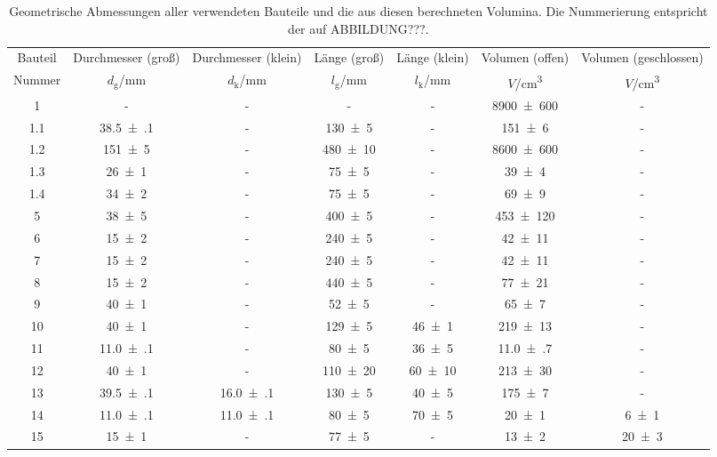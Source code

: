 \begin{table}[!h]
	\centering
	\begin{adjustbox}{width=\textwidth}
	\begin{tabular}{ccccccc}
		\toprule
		Bauteil & Durchmesser (groß) & Durchmesser (klein) & Länge (groß) & Länge (klein) & Volumen (offen) & Volumen (geschlossen)\\
		Nummer & $d_\mathrm{g}$/\si{mm} & $d_\mathrm{k}$/\si{mm} & $l_\mathrm{g}$/\si{mm} & $l_\mathrm{k}$/\si{mm} & $V$/\si{cm\cubed} & $V$/\si{cm\cubed}\\
\midrule
		\num{1} & - & - & - & - & \num{8900(600)} & -\\
		\num{1.1} & \num{38.5(1)} & - & \num{130(5)} & - & \num{151(6)} & -\\
		\num{1.2} & \num{151(5)} & - & \num{480(10)} & - & \num{8600(600)} & -\\
		\num{1.3} & \num{26(1)} & - & \num{75(5)} & - & \num{39(4)} & -\\
		\num{1.4} & \num{34(2)} & - & \num{75(5)} & - & \num{69(9)} & -\\
		\num{5} & \num{38(5)} & - & \num{400(5)} & - & \num{453(120)} & -\\
		\num{6} & \num{15(2)} & - & \num{240(5)} & - & \num{42(11)} & -\\
		\num{7} & \num{15(2)} & - & \num{240(5)} & - & \num{42(11)} & -\\
		\num{8} & \num{15(2)} & - & \num{440(5)} & - & \num{77(21)} & -\\
		\num{9} & \num{40(1)} & - & \num{52(5)} & - & \num{65(7)} & -\\
		\num{10} & \num{40(1)} & - & \num{129(5)} & \num{46(1)} & \num{219(13)} & -\\
		\num{11} & \num{11.0(1)} & - & \num{80(5)} & \num{36(5)} & \num{11.0(7)} & -\\
		\num{12} & \num{40(1)} & - & \num{110(20)} & \num{60(10)} & \num{213(30)} & -\\
		\num{13} & \num{39.5(1)} & \num{16.0(1)} & \num{130(5)} & \num{40(5)} & \num{175(7)} & -\\
		\num{14} & \num{11.0(1)} & \num{11.0(1)} & \num{80(5)} & \num{70(5)} & \num{20(1)} & \num{6(1)}\\
		\num{15} & \num{15(1)} & - & \num{77(5)} & - & \num{13(2)} & \num{20(3)}\\
		\bottomrule
	\end{tabular}
	\end{adjustbox}
	\caption{Geometrische Abmessungen aller verwendeten Bauteile und die aus diesen berechneten Volumina.
                  Die Nummerierung entspricht der auf ABBILDUNG???. \label{tab:Bauteile_Abmessungen}}
\end{table}
